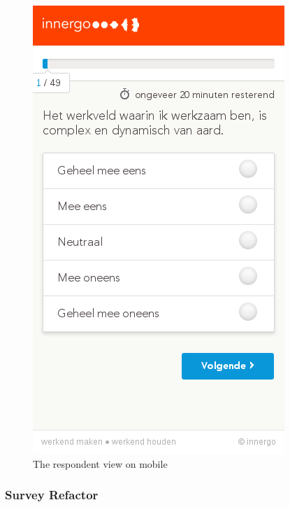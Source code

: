 \documentclass[10pt,a4paper]{beamer}
\begin{document}
\begin{frame}

\begin{figure}[htp]
\centering
\includegraphics[scale=0.32]{../img/calibris3.png}
 \caption{The respondent view on mobile}
 \label{fig.calibris3}
\end{figure}

\end{frame}

\subsubsection{Survey Refactor}
\end{document}
